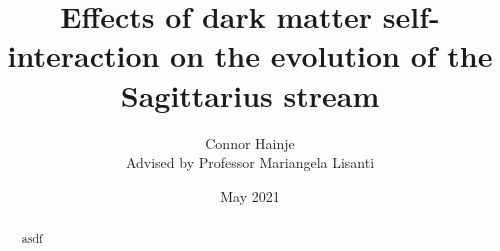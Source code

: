 \documentclass{report}
\title{Effects of dark matter self-interaction on the evolution of the Sagittarius stream}
\author{Connor Hainje\\Advised by Professor Mariangela Lisanti}
\date{May 2021}
\begin{document}
\maketitle

\begin{abstract}
    asdf
\end{abstract}

\tableofcontents 

\newpage





% 
% 

\printbibliography
\end{document}
